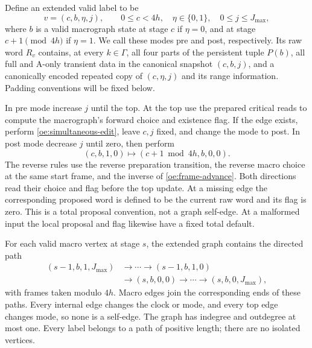 Define an extended valid label to be
\begin{equation}\label{oe:extended-label}
 v=(c,b,\eta,j),\qquad
 0\leq c<4h,\quad \eta\in\{0,1\},\quad 0\leq j\leq J_{\max},
\end{equation}
where $b$ is a valid macrograph state at stage $c$ if $\eta=0$, and at
stage $c+1\pmod{4h}$ if $\eta=1$. We call these modes pre and post,
respectively. Its raw word $R_v$ contains, at every $k\in\Gamma$, all four
parts of the persistent tuple $P(b)$, all full and A-only transient data
in the canonical snapshot $(c,b,j)$, and a canonically encoded repeated
copy of $(c,\eta,j)$ and its range information. Padding conventions will
be fixed below.

In pre mode increase $j$ until the top. At the top use the prepared
critical reads to compute the macrograph's forward choice and existence
flag. If the edge exists, perform \eqref{oe:simultaneous-edit}, leave
$c,j$ fixed, and change the mode to post. In post mode decrease $j$ until
zero, then perform
\begin{equation}\label{oe:frame-advance}
 (c,b,1,0)\longmapsto(c+1\bmod4h,b,0,0).
\end{equation}
The reverse rules use the reverse preparation transition, the reverse
macro choice at the same start frame, and the inverse of
\eqref{oe:frame-advance}. Both directions read their choice and flag
before the top update. At a missing edge the corresponding proposed word
is defined to be the current raw word and its flag is zero. This is a
total proposal convention, not a graph self-edge. At a malformed input
the local proposal and flag likewise have a fixed total default.

For each valid macro vertex at stage $s$, the extended graph contains the
directed path
\begin{equation}\label{oe:replacement-path}
 \begin{split}
 (s-1,b,1,J_{\max})&\longrightarrow\cdots
 \longrightarrow(s-1,b,1,0)\\
 &\longrightarrow(s,b,0,0)
 \longrightarrow\cdots\longrightarrow(s,b,0,J_{\max}),
 \end{split}
\end{equation}
with frames taken modulo $4h$. Macro edges join the corresponding ends
of these paths. Every internal edge changes the clock or mode, and every
top edge changes mode, so none is a self-edge. The graph has indegree and
outdegree at most one. Every label belongs to a path of positive length;
there are no isolated vertices.

